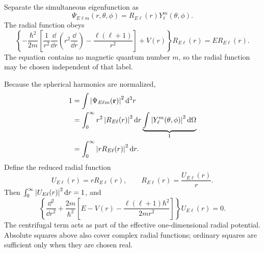Separate the simultaneous eigenfunction as
\[
 \Psi_{E\ell m}(r,\theta,\phi)
 =R_{E\ell}(r)Y_\ell^m(\theta,\phi).
\]
The radial function obeys
\[
 \left\{-\frac{\hbar^2}{2m}
 \left[\frac1{r^2}\frac\dd{\dd r}\left(r^2\frac\dd{\dd r}\right)
       -\frac{\ell(\ell+1)}{r^2}\right]+V(r)\right\}
 R_{E\ell}(r)=E R_{E\ell}(r).
\]
The equation contains no magnetic quantum number $m$, so the radial
function may be chosen independent of that label.

Because the spherical harmonics are normalized,
\begin{align*}
 1&=\int\left\lvert\Psi_{E\ell m}(\mathbf r)\right\rvert^2\mathop{}\!\mathrm{d}^3r\\
  &=\int_0^\infty r^2\left\lvert R_{E\ell}(r)\right\rvert^2\mathop{}\!\mathrm{d} r
     \underbrace{\int\left\lvert Y_\ell^m(\theta,\phi)\right\rvert^2\mathop{}\!\mathrm{d}\Omega}_{1}\\
  &=\int_0^\infty\left\lvert rR_{E\ell}(r)\right\rvert^2\mathop{}\!\mathrm{d} r.
\end{align*}
Define the reduced radial function
\[
 U_{E\ell}(r)=rR_{E\ell}(r),\qquad
 R_{E\ell}(r)=\frac{U_{E\ell}(r)}r.
\]
Then $\int_0^\infty\left\lvert U_{E\ell}(r)\right\rvert^2\mathop{}\!\mathrm{d} r=1$, and
\[
 \boxed{\left\{\frac{\dd^2}{\dd r^2}
 +\frac{2m}{\hbar^2}\left[E-V(r)
       -\frac{\ell(\ell+1)\hbar^2}{2mr^2}\right]\right\}
       U_{E\ell}(r)=0.}
\]
The centrifugal term acts as part of the effective one-dimensional
radial potential. Absolute squares above also cover complex radial
functions; ordinary squares are sufficient only when they are chosen
real.

